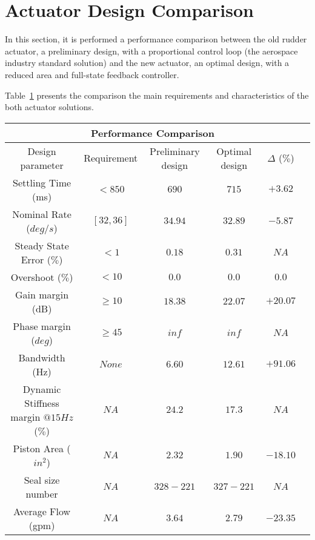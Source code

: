 \section{Actuator Design Comparison}

In this section, it is performed a performance comparison between the old rudder actuator, a preliminary design, with a proportional control loop (the aerospace industry standard solution) and the new actuator, an optimal design, with a reduced area and full-state feedback controller.

Table~\ref{table:design_comp} presents the comparison the main requirements and characteristics of the both actuator solutions. 

\begin{table}[H]
    \label{table:design_comp}
    \centering
	\resizebox{16cm}{!} {
    \begin{tabular}{|c|c|c|c|c|c|}
    \hline
    \multicolumn{5}{|c|}{Performance Comparison} \\ \hline
    Design parameter & Requirement & Preliminary design & Optimal design & $\Delta$ ($\%$) \\ \hline
    Settling Time (ms) & $ < 850 $ & $690$ & $715$ & $+3.62$\\ \hline
	Nominal Rate ($deg/s$) & $[32,36]$ & $34.94$ & $32.89$ & $-5.87$\\ \hline
	Steady State Error ($\%$) & $< 1$ & $0.18$ & $0.31$ & $NA$\\ \hline
	Overshoot ($\%$) & $< 10 $ & $0.0$ & $0.0$ & $0.0$\\ \hline
	Gain margin (dB) & $ \geq 10 $ & $18.38$ & $22.07$ & $+20.07$\\ \hline
    Phase margin ($deg$) & $ \geq 45$ & $inf$ & $inf$ & $NA$\\ \hline
    Bandwidth (Hz) & $None$ & $6.60$ & $12.61$ & $+91.06$\\ \hline
	Dynamic Stiffness margin $@15Hz$ ($\%$) & $NA$ & $24.2$ & $17.3$ & $NA$ \\ \hline
	Piston Area ($in^2$) & $NA$ & $2.32$ & $1.90$ & $-18.10$\\ \hline
	Seal size number & $NA$ & $328-221$ & $327-221$ & $NA$ \\ \hline
	Average Flow (gpm) & $NA$ & $3.64$ & $2.79$ & $-23.35$\\ \hline
    \end{tabular}
    }

\end{table}

